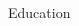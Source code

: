 \documentclass{resume}
\begin{document}
\begin{rSection}{Education}
\begin{adjustwidth}{7em}{0pt}
\end{adjustwidth}

\end{rSection}

%
%
%
%
%
%
%
%
%
%
\end{document}
